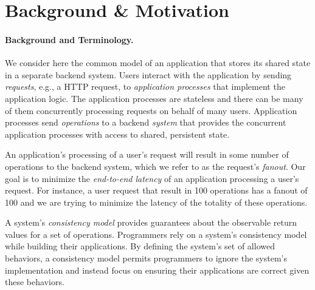 \section{Background \& Motivation}


\paragraph{Background and Terminology.}
We consider here the common model of an application that stores its shared state in a separate backend system.
Users interact with the application by sending \textit{requests}, e.g., a HTTP request, to \textit{application processes} that implement the application logic. The application processes are stateless and there can be many of them concurrently processing requests on behalf of many users. Application processes send \textit{operations} to a backend \textit{system} that provides the concurrent application processes with access to shared, persistent state.



An application's processing of a user's request will result in some number of operations to the backend system, which we refer to as the request's \textit{fanout}. Our goal is to minimize the \textit{end-to-end latency} of an application processing a user's request. For instance, a user request that result in 100 operations has a fanout of 100 and we are trying to minimize the latency of the totality of these operations.

A system's \textit{consistency model} provides guarantees about the observable return values for a set of operations.
Programmers rely on a system's consistency model while building their applications. By defining the system's set of allowed behaviors, a consistency model permits programmers to ignore the system's implementation and instead focus on ensuring their applications are correct given these behaviors.

